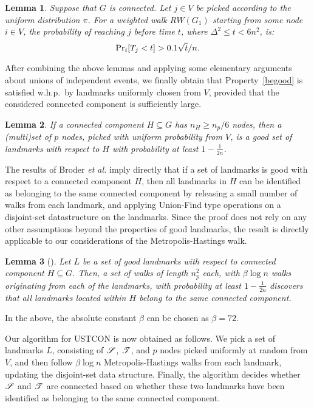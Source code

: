 \documentclass[11pt,a4paper]{article}
\newtheorem{lemma}{Lemma}
\newcommand{\Broder}{Broder \etal}
\newcommand{\etal}{\textsl{et al.}\xspace}
\newcommand{\s}{\ensuremath  \mathscr S}
\renewcommand{\t}{\ensuremath \mathscr  T}
\renewcommand{\Pr}{\ensuremath \mathrm {Pr}}
\renewcommand{\*}{\hspace*{5mm}}
\begin{document}
\begin{lemma}\label{lemB}
Suppose that $G$ is connected. Let $j\in V$ be picked according to the uniform distribution $\pi$. For a weighted walk $RW(G_1)$ starting from some node $i \in V$, the probability of reaching $j$ before time $t$, where $\Delta^2 \leq t < 6n^2$, is:
$$
\Pr_{i} [T_j < t ] > 0.1 \sqrt t / n.
$$
\end{lemma}

After combining the above lemmas and applying some elementary arguments about unions of independent events, we finally obtain that Property~\ref{begood} is satisfied w.h.p.\ by landmarks uniformly chosen from $V$, provided that the considered connected component is sufficiently large.

\begin{lemma}\label{lemGood}
If a connected component $H \subseteq G$ has $n_H \geq n_p/6$ nodes, then a (multi)set of $p$ nodes, picked with uniform probability from $V$, is a good set of landmarks with respect to $H$ with probability at least $1- \frac{1}{2n}$.
\end{lemma}


The results of \Broder imply directly that if a set of landmarks is good with respect to a connected component $H$, then all landmarks in $H$ can be identified as belonging to the same connected component by releasing a small number of walks from each landmark, and applying Union-Find type operations on a disjoint-set datastructure on the landmarks. Since the proof does not rely on any other assumptions beyond the properties of good landmarks, the result is directly applicable to our considerations of the Metropolis-Hastings walk.

\begin{lemma}[\cite{BKRU}]\label{bro}
Let $L$ be a set of good landmarks with respect to connected component $H \subseteq G$. Then, a set of walks of length $n_p^2$ each, with $\beta \log n$ walks originating from each of the landmarks, with probability at least $1-\frac{1}{2n}$ discovers that all landmarks located within $H$ belong to the same connected component.
\end{lemma}
\noindent
In the above, the absolute constant $\beta$ can be chosen as $\beta = 72$.

Our algorithm for USTCON is now obtained as follows. We pick a set of landmarks $L$, consisting of $\s$, $\t$, and $p$ nodes picked uniformly at random from $V$, and then follow $\beta \log n$ Metropolis-Hastings walks from each landmark, updating the disjoint-set data structure. Finally, the algorithm decides whether $\s$ and $\t$ are connected based on whether these two landmarks have been identified as belonging to the same connected component.
\end{document}
